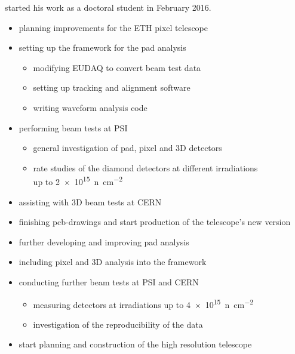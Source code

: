 \me started his work as a doctoral student in February 2016.\parsmall

\begin{itemize}
  \item planning improvements for the ETH pixel telescope %
  \item setting up the framework for the pad analysis %
  \begin{itemize}
		\item modifying EUDAQ to convert beam test data %
		\item setting up tracking and alignment software
		\item writing waveform analysis code
  \end{itemize}
  \item performing beam tests at \ac{PSI}
  \begin{itemize}
    \item general investigation of pad, pixel and 3D detectors
    \item rate studies of the diamond detectors at different irradiations\\ up to \SI{2e15}{n\per\centi\meter^2}
  \end{itemize}
  \item assisting with 3D beam tests at CERN
\end{itemize}

\begin{itemize}
  \item finishing pcb-drawings and start production of the telescope's new version
  \item further developing and improving pad analysis
  \item including pixel and 3D analysis into the framework
  \item conducting further beam tests at \ac{PSI} and CERN
  \begin{itemize}
		\item measuring detectors at irradiations up to \SI{4e15}{n\per\centi\meter^2}
		\item investigation of the reproducibility of the data
  \end{itemize}
  \item start planning and construction of the high resolution telescope
\end{itemize}

